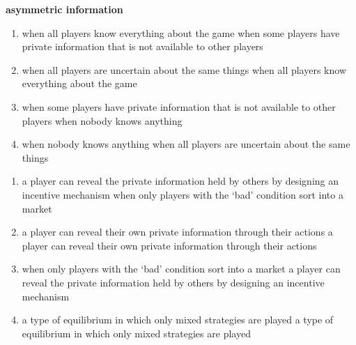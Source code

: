 \documentclass{article}
\begin{document}
\begin{question}[type=exam]{4}
  \textbf{asymmetric information}
  \begin{enumerate}[label=\alph*), noitemsep]
    \item \vary
    {when all players know everything about the game}
    {when some players have private information that is not available to other players} %
    \item \vary
    {when all players are uncertain about the same things}
    {when all players know everything about the game}
    \item \vary
    {when some players have private information that is not available to other players} %
    {when nobody knows anything}
    \item \vary
    {when nobody knows anything}
    {when all players are uncertain about the same things}
  \end{enumerate}
\end{question}

\begin{question}[type=exam]{4}
  \textbf{}
  \begin{enumerate}[label=\alph*), noitemsep]
    \item \vary
    {a player can reveal the private information held by others by designing an incentive mechanism} %
    {when only players with the `bad' condition sort into a market}
    \item \vary
    {a player can reveal their own private information through their actions}
    {a player can reveal their own private information through their actions} %
    \item \vary
    {when only players with the `bad' condition sort into a market}
    {a player can reveal the private information held by others by designing an incentive mechanism}
    \item \vary
    {a type of equilibrium in which only mixed strategies are played}
    {a type of equilibrium in which only mixed strategies are played}
  \end{enumerate}
\end{question}
\end{document}
